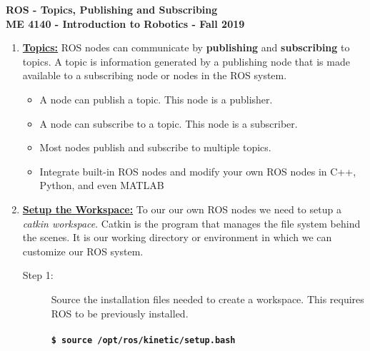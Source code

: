 \documentclass[12pt]{article}
\newcommand{\rosdistro}{kinetic}
\begin{document}
\thispagestyle{plain}

\begin{center}
   {\bf \Large ROS - Topics, Publishing and Subscribing}\vspace{2mm} \\
   {\bf \large ME 4140 - Introduction to Robotics - Fall 2019} \vspace{5mm}\\
\end{center}

\begin{enumerate}
    \item  \href{http://wiki.ros.org/Topics}{\bf Topics:} ROS nodes can communicate by {\bf publishing} and {\bf subscribing} to topics. A topic is information generated by a publishing node that is made available to a subscribing node or nodes in the ROS system.
        
        \begin{itemize}		
            \item A node can publish a topic. This node is a publisher.    	
            \item A node can subscribe to a topic. This node is a subscriber.
            \item Most nodes publish and subscribe to multiple topics. 
            \item Integrate built-in ROS nodes and modify your own ROS nodes in C++, Python, and even MATLAB
            
        \end{itemize}

	\item \href{http://wiki.ros.org/catkin/Tutorials/create_a_workspace}{\bf Setup the Workspace:} To our our own ROS nodes we need to setup a {\it catkin workspace}. Catkin is the program that manages the file system behind the scenes. It is our working directory or environment in which we can customize our ROS system.

	\begin{description}

		\item[Step 1:] Source the installation files needed to create a workspace. This requires ROS to be previously installed.\\\\
		{\bf \texttt{\$ source /opt/ros/\rosdistro/setup.bash}}\\



\end{description}
\end{enumerate}
\end{document}
